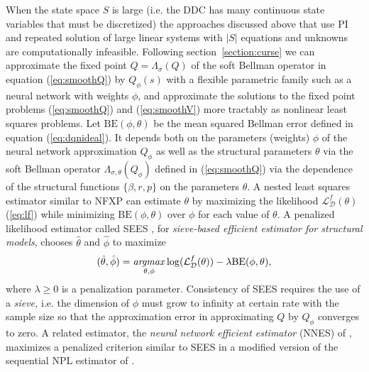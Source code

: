 When the state space $S$ is large (i.e. the DDC has many continuous state variables that must be discretized)
the approaches discussed above that use PI and repeated solution of
large linear systems with $|S|$ equations and unknowns are computationally infeasible. 
Following section~\ref{section:curse} we can approximate 
the fixed point $Q=\Lambda_\sigma(Q)$ of the soft Bellman operator in equation (\ref{eq:smoothQ}) by $Q_\phi(s)$
with a flexible parametric family such as a neural network with weights $\phi$, and  approximate
the solutions to 
the fixed point problems (\ref{eq:smoothQ}) and (\ref{eq:smoothV}) more tractably as nonlinear least squares problems.  
Let $\mbox{BE}(\phi,\theta)$ be the mean squared Bellman error defined in equation (\ref{eq:dqnideal}).
It depends both on the parameters (weights) $\phi$ of the neural network approximation $Q_\phi$
as well as the structural parameters $\theta$ via the soft Bellman operator $\Lambda_{\sigma,\theta}(Q_\phi)$ 
defined in (\ref{eq:smoothQ})  via the dependence of the structural functions $\{\beta,r,p\}$ on the parameters
$\theta$.  A nested least squares estimator similar to NFXP can estimate $\theta$ 
by maximizing the likelihood $\mathcal{L}^f_{\mathcal{D}}(\theta)$ (\ref{eq:lf}) while minimizing 
$\mbox{BE}(\phi,\theta)$ over $\phi$ for
each value of $\theta$. A penalized likelihood estimator called SEES \citep{LuoSang:2024}, for {\it sieve-based efficient estimator for
structural models\/}, chooses $\hat\theta$ and $\hat\phi$ to maximize 
\begin{equation}
(\hat\theta,\hat\phi)=\mathop{\it argmax}_{\theta,\phi} \log(\mathcal{L}^f_{\mathcal{D}}(\theta))-\lambda \mbox{BE}(\phi,\theta),
\label{eq:penalizedllf}
\end{equation}
where $\lambda \ge 0$ is a penalization parameter. Consistency of SEES requires the use of a {\it sieve,\/} i.e.
the dimension of $\phi$ must grow to infinity at certain rate with the sample
size so that the approximation error in approximating $Q$ by $Q_\phi$ converges to zero.
A related estimator, the {\it neural network efficient estimator\/} (NNES) of \citet{Nguyen:2025}, maximizes a penalized criterion
similar to SEES in a modified version of the sequential NPL
estimator of \citet{AguirregabiriaMira:2002}.

